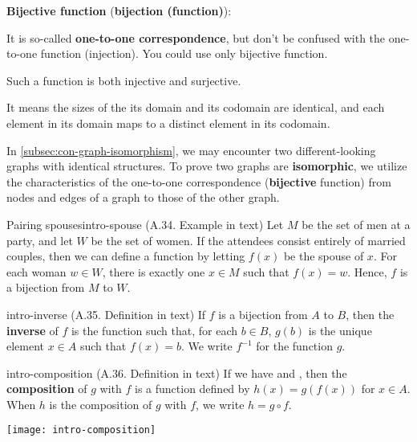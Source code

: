 \documentclass[../src/handouts/main.tex]{subfiles}
\begin{document}
\textbf{Bijective function} (\textbf{bijection (function)}):
\begin{enumerate*}
  \item It is so-called \textbf{one-to-one correspondence}, but don't be confused with the one-to-one function (injection). You could use only bijective function.
  \item Such a function is both injective and surjective.
  \item It means the sizes of the its domain and its codomain are identical, and each element in its domain maps to a distinct element in its codomain.
  \item In \cref{subsec:con-graph-isomorphism}, we may encounter two different-looking graphs with identical structures. To prove two graphs are \textbf{isomorphic}, we utilize the characteristics of the one-to-one correspondence (\textbf{bijective} function) from nodes and edges of a graph to those of the other graph.
\end{enumerate*}
\vspace{1em}

\begin{example}{Pairing spouses}{intro-spouse}
  (A.34. Example in text)
  Let $M$ be the set of men at a party, and let $W$ be the set of women.
  If the attendees consist entirely of married couples, then we can define a function  by letting $f(x)$ be the spouse of $x$.
  For each woman $w \in W$, there is exactly one $x \in M$ such that $f(x) = w$.
  Hence, $f$ is a bijection from $M$ to $W$.
\end{example}

\begin{definition}{}{intro-inverse}
  (A.35. Definition in text)
  If $f$ is a bijection from $A$ to $B$, then the \textbf{inverse} of $f$ is the function  such that, for each $b \in B$, $g(b)$ is the unique element $x \in A$ such that $f(x) = b$.
  We write $f^{-1}$ for the function $g$.
\end{definition}

\begin{definition}{}{intro-composition}
  (A.36. Definition in text)
  If we have  and , then the \textbf{composition} of $g$ with $f$ is a function  defined by $h(x) = g(f(x))$ for $x \in A$.
  When $h$ is the composition of $g$ with $f$, we write $h = g \circ f$.

  \centering
  \texttt{[image: intro-composition]}
\end{definition}
\end{document}
